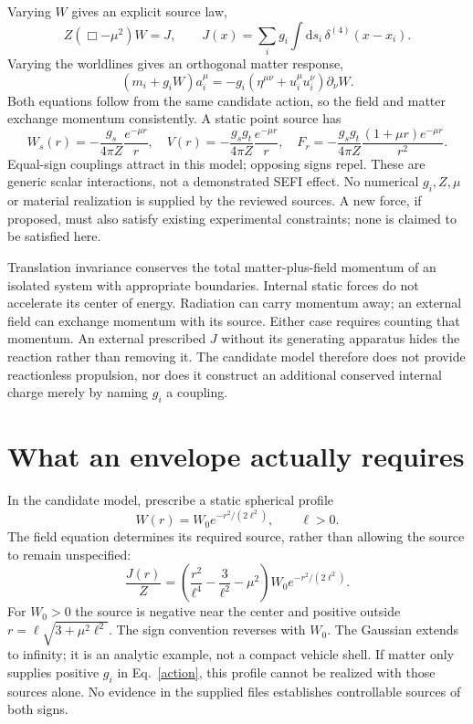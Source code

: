 \documentclass[11pt]{article}
\newcommand{\dd}{\mathrm{d}}
\newcommand{\Boxop}{\mathop{\Box}}
\begin{document}
Varying $W$ gives an explicit source law,
\begin{equation}
 Z(\Boxop-\mu^2)W=J,\qquad
 J(x)=\sum_i g_i\int\dd s_i\,\delta^{(4)}(x-x_i).
\end{equation}
Varying the worldlines gives an orthogonal matter response,
\begin{equation}
 (m_i+g_iW)a_i^\mu=-g_i(\eta^{\mu\nu}+u_i^\mu u_i^\nu)\partial_\nu W.
\end{equation}
Both equations follow from the same candidate action, so the field and matter exchange momentum consistently. A static point source has
\begin{equation}
 W_s(r)=-\frac{g_s}{4\pi Z}\frac{e^{-\mu r}}r,
 \quad V(r)=-\frac{g_sg_t}{4\pi Z}\frac{e^{-\mu r}}r,
 \quad F_r=-\frac{g_sg_t}{4\pi Z}\frac{(1+\mu r)e^{-\mu r}}{r^2}.
\end{equation}
Equal-sign couplings attract in this model; opposing signs repel. These are generic scalar interactions, not a demonstrated SEFI effect. No numerical $g_i,Z,\mu$ or material realization is supplied by the reviewed sources. A new force, if proposed, must also satisfy existing experimental constraints; none is claimed to be satisfied here.

Translation invariance conserves the total matter-plus-field momentum of an isolated system with appropriate boundaries. Internal static forces do not accelerate its center of energy. Radiation can carry momentum away; an external field can exchange momentum with its source. Either case requires counting that momentum. An external prescribed $J$ without its generating apparatus hides the reaction rather than removing it. The candidate model therefore does not provide reactionless propulsion, nor does it construct an additional conserved internal charge merely by naming $g_i$ a coupling.
\newpage
\section{What an envelope actually requires}
In the candidate model, prescribe a static spherical profile
\begin{equation}
 W(r)=W_0e^{-r^2/(2\ell^2)},\qquad \ell>0.
\end{equation}
The field equation determines its required source, rather than allowing the source to remain unspecified:
\begin{equation}
 \boxed{\frac{J(r)}Z=\left(\frac{r^2}{\ell^4}-\frac3{\ell^2}-\mu^2\right)
                         W_0e^{-r^2/(2\ell^2)}.}
\end{equation}
For $W_0>0$ the source is negative near the center and positive outside $r=\ell\sqrt{3+\mu^2\ell^2}$. The sign convention reverses with $W_0$. The Gaussian extends to infinity; it is an analytic example, not a compact vehicle shell. If matter only supplies positive $g_i$ in Eq.~\eqref{action}, this profile cannot be realized with those sources alone. No evidence in the supplied files establishes controllable sources of both signs.
\end{document}

